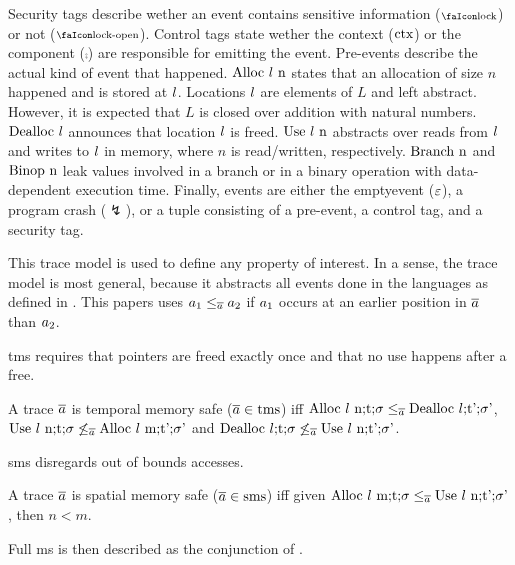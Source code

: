 \documentclass[utf8,acmsmall,review,screen,dvipsnames]{acmart}
\begin{document}
Security tags describe wether an event contains sensitive information ($\lock$) or not ($\unlock$).
Control tags state wether the context ($\ctx$) or the component ($\comp$) are responsible for emitting the event.
Pre-events describe the actual kind of event that happened.
$\ev{Alloc\ \loc\ n}$ states that an allocation of size $n$ happened and is stored at $\loc$.
Locations $\loc$ are elements of $L$ and left abstract.
However, it is expected that $L$ is closed over addition with natural numbers.
$\ev{Dealloc\ \loc}$ announces that location $\loc$ is freed.
$\ev{Use\ \loc\ n}$ abstracts over reads from $\loc$ and writes to $\loc$ in memory, where $n$ is read/written, respectively.
$\ev{Branch\ n}$ and $\ev{Binop\ n}$ leak values involved in a branch or in a binary operation with data-dependent execution time.
Finally, events are either the emptyevent ($\emptyevent$), a program crash ($\lightning$), or a tuple consisting of a pre-event, a control tag, and a security tag.

This trace model is used to define any property of interest.
In a sense, the trace model is most general, because it abstracts all events done in the languages as defined in .
This papers uses $\event[_{1}]\le_{\trace}\event[_{2}]$ if $\event[_{1}]$ occurs at an earlier position in $\trace$ than $\event[_{2}]$.

\gls{tms} requires that pointers are freed exactly once and that no use happens after a free.

\begin{definition}\label{def:trace:tmsdef}
  A trace $\trace$ is temporal memory safe ($\trace\in\tmssafe$) iff $\ev{Alloc\ \loc\ n;\sandboxtag;\securitytag}\le_{\trace}\ev{Dealloc\ \loc;\sandboxtag';\securitytag'}$, $\ev{Use\ \loc\ n;\sandboxtag;\securitytag}\not\le_{\trace}\ev{Alloc\ \loc\ m;\sandboxtag';\securitytag'}$ and $\ev{Dealloc\ \loc;\sandboxtag;\securitytag}\not\le_{\trace}\ev{Use\ \loc\ n;\sandboxtag';\securitytag'}$.
\end{definition}

\gls{sms} disregards out of bounds accesses.

\begin{definition}\label{def:trace:smsdef}
  A trace $\trace$ is spatial memory safe ($\trace\in\smssafe$) iff given $\ev{Alloc\ \loc\ m;\sandboxtag;\securitytag}\le_{\trace}\ev{Use\ \loc\ n;\sandboxtag';\securitytag'}$, then $n<m$.
\end{definition}

Full \gls{ms} is then described as the conjunction of .
\end{document}
